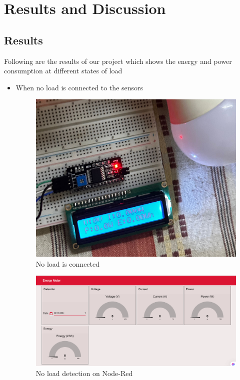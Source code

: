 \documentclass[a4paper,12pt]{report}
\begin{document}
\section{Results and Discussion}
\subsection{Results}
Following are the results of our project which shows the energy and power consumption at different states of load
\begin{itemize}
    \item When no load is connected to the sensors
    \begin{figure}[H]
        \centering
        \includegraphics[width=0.9\linewidth]{WhatsApp Image 2024-12-22 at 18.50.10.jpeg}
        \caption{No load is connected}
        \label{fig:No load}
    \end{figure}
    \begin{figure}[H]
        \centering
        \includegraphics[width=1.0\linewidth]{Project/Screenshot 2024-12-22 162604.png}
        \caption{No load detection on Node-Red}

\end{figure}
\end{itemize}
\end{document}
